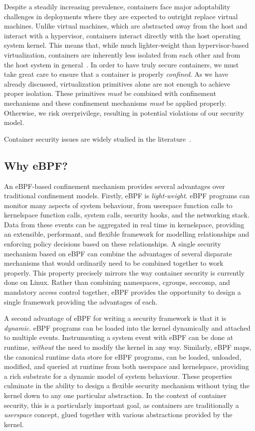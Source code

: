 Despite a steadily increasing prevalence, containers face major adoptability challenges in
deployments where they are expected to outright replace virtual machines. Unlike virtual
machines, which are abstracted away from the host and interact with a hypervisor,
containers interact directly with the host operating system kernel. This means that, while
much lighter-weight than hypervisor-based virtualization, containers are inherently less
isolated from each other and from the host system in general~. In order to have truly secure containers, we must take great care to ensure
that a container is properly \textit{confined}. As we have already discussed,
virtualization primitives alone are not enough to achieve proper isolation. These
primitives \textit{must} be combined with confinement mechanisms and these confinement
mechanisms \textit{must} be applied properly.  Otherwise, we risk overprivilege, resulting
in potential violations of our security model.

Container security issues are widely studied in the literature~.

\subsection{Why eBPF?}%
\label{ss:why-ebpf}

An eBPF-based confinement mechanism provides several advantages over traditional
confinement models.  Firstly, eBPF is \textit{light-weight}. eBPF programs can monitor
many aspects of system behaviour, from userspace function calls to kernelspace function
calls, system calls, security hooks, and the networking stack. Data from these events can
be aggregated in real time in kernelspace, providing an extensible, performant, and
flexible framework for modelling relationships and enforcing policy decisions based on
these relationships.  A single security mechanism based on eBPF can combine the advantages
of several disparate mechanisms that would ordinarily need to be combined together to work
properly. This property precisely mirrors the way container security is currently done on
Linux. Rather than combining namespaces, cgroups, seccomp, and mandatory access control
together, eBPF provides the opportunity to design a single framework providing the
advantages of each.

A second advantage of eBPF for writing a security framework is that it is
\textit{dynamic}. eBPF programs can be loaded into the kernel dynamically and attached to
multiple events. Instrumenting a system event with eBPF can be done at runtime,
\textit{without} the need to modify the kernel in any way.  Similarly, eBPF maps, the
canonical runtime data store for eBPF programs, can be loaded, unloaded, modified, and
queried at runtime from both userspace and kernelspace, providing a rich substrate for
a dynamic model of system behaviour. These properties culminate in the ability to design
a flexible security mechanism without tying the kernel down to any one particular
abstraction. In the context of container security, this is a particularly important goal,
as containers are traditionally a \textit{userspace} concept, glued together with various
abstractions provided by the kernel.

